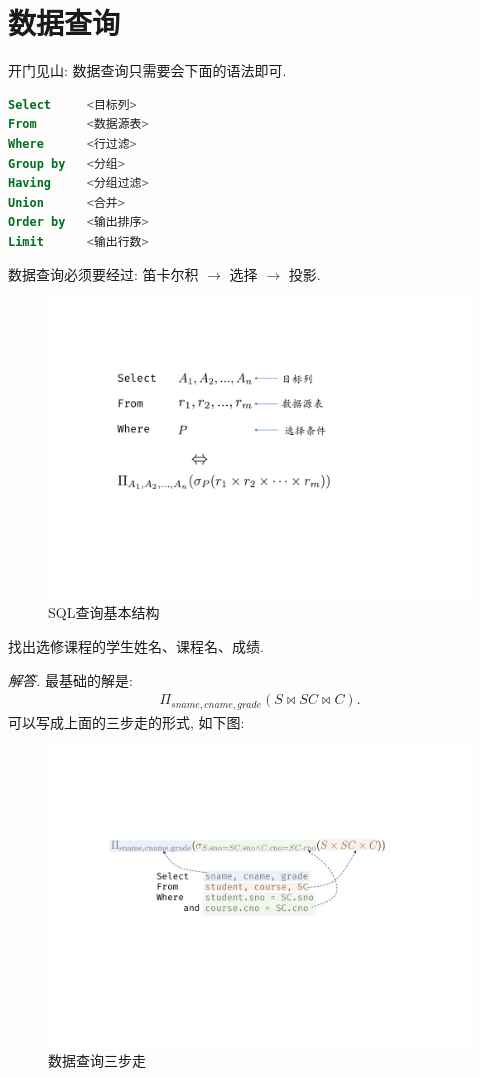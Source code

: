 \section{数据查询}

开门见山: 数据查询只需要会下面的语法即可.
\begin{lstlisting}[language=SQL]
Select     <目标列>
From       <数据源表>
Where      <行过滤>
Group by   <分组>
Having     <分组过滤>
Union      <合并>
Order by   <输出排序>
Limit      <输出行数>
\end{lstlisting}

数据查询必须要经过: 笛卡尔积 $\to$ 选择 $\to$ 投影.

\begin{figure}[H]
    \centering
    \includegraphics[width=.5\textwidth]{figure/数据查询.pdf}
    \caption{SQL查询基本结构}
\end{figure}

\begin{example}
  找出选修课程的学生姓名、课程名、成绩.
\end{example}

\textit{ 解答. }最基础的解是:
\begin{align*}
    \Pi_{sname,cname,grade} (S \bowtie SC \bowtie C).
\end{align*}
可以写成上面的三步走的形式, 如下图:
\begin{figure}[H]
    \centering
    \includegraphics[width=.7\textwidth]{figure/查询例题1.pdf}
    \caption{数据查询三步走}
\end{figure}

